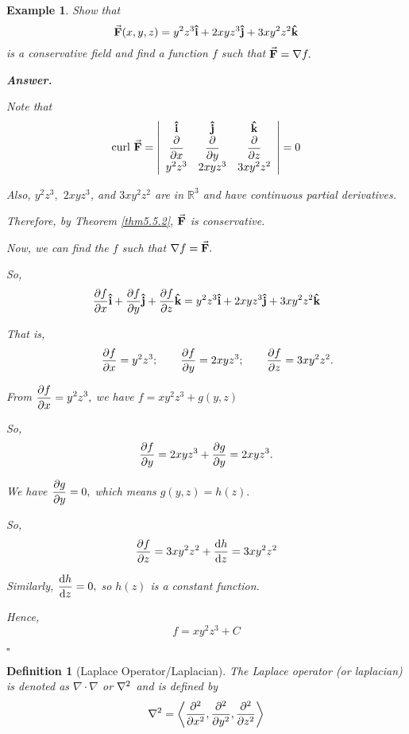 \documentclass[12pt,a4paper]{article}
\newtheorem{df}{Definition}[subsection]
\newtheorem{eg}{Example}[subsection]
\newenvironment*{ans}{\par\indent\textbf{\textit{Answer. }}\par}{\par\hfill{$\square$}\par}
\def\dsst{\displaystyle}
\def\R{{\mathbb{R}}}
\def\veci{\vu{\boldsymbol{\textbf{i}}}}
\def\vecj{\vu{\boldsymbol{\textbf{j}}}}
\def\veck{\vu{\boldsymbol{\textbf{k}}}}
\def\F{\va{\boldsymbol{\textbf{F}}}}
\def\Curl{\text{curl }}
\begin{document}
\begin{eg}
	Show that \[\F(x,y,z)=y^2z^3\veci+2xyz^3\vecj+3xy^2z^2\veck\] is a conservative field and find a function $f$ such that $\F=\nabla f.$	
	\begin{ans}
		Note that \[\Curl\F=\qty|\begin{array}{ccc}\veci&\vecj&\veck\\\dsst\pdv{x}&\dsst\pdv{y}&\dsst\pdv{z}\\y^2z^3&2xyz^3&3xy^2z^2\end{array}|=0\]\par Also, $y^2z^3,$ $2xyz^3$, and $3xy^2z^2$ are in $\R^3$ and have continuous partial derivatives.\par Therefore, by Theorem \ref{thm5.5.2}, $\F$ is conservative.\par Now, we can find the $f$ such that $\nabla f=\F.$\par So, \[\pdv{f}{x}\veci+\pdv{f}{y}\vecj+\pdv{f}{z}\veck=y^2z^3\veci+2xyz^3\vecj+3xy^2z^2\veck\]\par That is, \[\qquad\pdv{f}{x}=y^2z^3;\qquad\pdv{f}{y}=2xyz^3;\qquad\pdv{f}{z}=3xy^2z^2.\]\par From $\dsst\pdv{f}{x}=y^2z^3,$ we have $f=xy^2z^3+g(y,z)$\par So, \[\pdv{f}{y}=2xyz^3+\pdv{g}{y}=2xyz^3.\]\par We have $\dsst\pdv{g}{y}=0,$ which means $g(y,z)=h(z).$\par So, \[\pdv{f}{z}=3xy^2z^2+\dv{h}{z}=3xy^2z^2\]\par Similarly, $\dsst\dv{h}{z}=0,$ so $h(z)$ is a constant function.\par Hence, \[\boxed{f=xy^2z^3+C}\]
	\end{ans}
\end{eg}
\begin{df}[Laplace Operator/Laplacian]
	The Laplace operator (or laplacian) is denoted as $\nabla\cdot\nabla$ or $\laplacian$ and is defined by \[\laplacian=\left\langle\pdv[2]{x},\pdv[2]{y},\pdv[2]{z}\right\rangle\]
\end{df}
\end{document}
